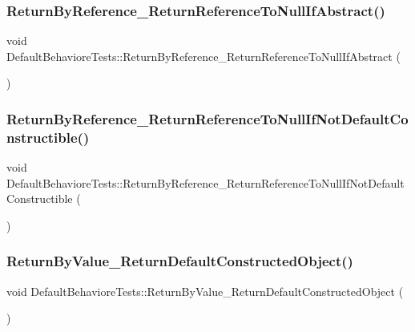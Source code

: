 \subsubsection{\texorpdfstring{ReturnByReference\_ReturnReferenceToNullIfAbstract()}{ReturnByReference\_ReturnReferenceToNullIfAbstract()}}
{\footnotesize\ttfamily void Default\+Behaviore\+Tests\+::\+Return\+By\+Reference\+\_\+\+Return\+Reference\+To\+Null\+If\+Abstract (\begin{DoxyParamCaption}{ }\end{DoxyParamCaption})\hspace{0.3cm}{\ttfamily [inline]}}

\mbox{\label{structDefaultBehavioreTests_a68e82dc645e6680c1112d4fef088bb6e}} 
\subsubsection{\texorpdfstring{ReturnByReference\_ReturnReferenceToNullIfNotDefaultConstructible()}{ReturnByReference\_ReturnReferenceToNullIfNotDefaultConstructible()}}
{\footnotesize\ttfamily void Default\+Behaviore\+Tests\+::\+Return\+By\+Reference\+\_\+\+Return\+Reference\+To\+Null\+If\+Not\+Default\+Constructible (\begin{DoxyParamCaption}{ }\end{DoxyParamCaption})\hspace{0.3cm}{\ttfamily [inline]}}

\mbox{\label{structDefaultBehavioreTests_a67c4e084ab4a9367946a9082f5a3e46e}} 
\subsubsection{\texorpdfstring{ReturnByValue\_ReturnDefaultConstructedObject()}{ReturnByValue\_ReturnDefaultConstructedObject()}}
{\footnotesize\ttfamily void Default\+Behaviore\+Tests\+::\+Return\+By\+Value\+\_\+\+Return\+Default\+Constructed\+Object (\begin{DoxyParamCaption}{ }\end{DoxyParamCaption})\hspace{0.3cm}{\ttfamily [inline]}}

